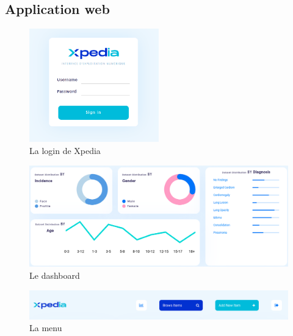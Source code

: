 \documentclass[12pt]{report}
\begin{document}
    \subsection{Application web}
    \begin{figure}[H]
        \centering
        \includegraphics[width=0.5\textwidth]{xpedia_log.png}
        \caption{La login de Xpedia}\label{fig:xpedia_log}
    \end{figure}
    \begin{figure}[H]
        \centering
        \includegraphics[width=\textwidth]{xpedia_dashboard.png}
        \caption{Le dashboard}\label{fig:xpedia_dashboard}
    \end{figure}
    \begin{figure}[H]
        \centering
        \includegraphics[width=1\textwidth]{xpedia_menu.png}
        \caption{La menu}\label{fig:xpedia_menu}
    \end{figure}
\end{document}
